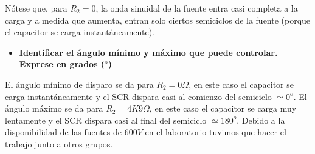 

\sangria{} Nótese que, para $R_2 = 0$, la onda sinuidal de la fuente entra casi completa a la carga y a medida que aumenta, entran solo ciertos semiciclos de la fuente (porque el capacitor se carga instantáneamente).

\begin{itemize}[nosep]
    \item \textbf{Identificar el ángulo mínimo y máximo que puede controlar. Exprese en grados ($\text{}^o$)}
\end{itemize}
\sangria{} El ángulo mínimo de disparo se da para $R_2 = 0 \Omega$, en este caso el capacitor se carga instantáneamente y el SCR dispara casi al comienzo del semiciclo $\simeq 0^o$. El ángulo máximo se da para $R_2 =4K9 \Omega$, en este caso el capacitor se carga muy lentamente y el SCR dispara casi al final del semiciclo $\simeq 180^o$.
\sangria{} Debido a la disponibilidad de las fuentes de $600V$ en el laboratorio tuvimos que hacer el trabajo junto a otros grupos.

